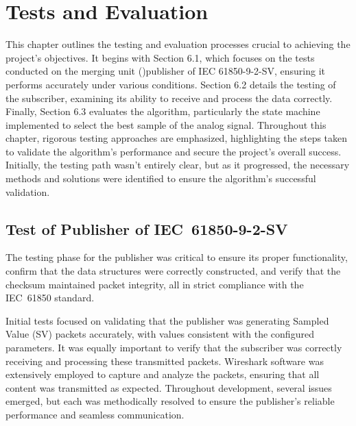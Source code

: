 
\chapter{Tests and Evaluation} %

\label{chap:Chapter6} %


This chapter outlines the testing and evaluation processes crucial to achieving the project’s objectives. It begins with Section 6.1, which focuses on the tests conducted on the merging unit ()publisher of IEC 61850-9-2-SV, ensuring it performs accurately under various conditions. Section 6.2 details the testing of the subscriber, examining its ability to receive and process the data correctly. Finally, Section 6.3 evaluates the algorithm, particularly the state machine implemented to select the best sample of the analog signal. Throughout this chapter, rigorous testing approaches are emphasized, highlighting the steps taken to validate the algorithm's performance and secure the project's overall success. Initially, the testing path wasn’t entirely clear, but as it progressed, the necessary methods and solutions were identified to ensure the algorithm’s successful validation.

\section{Test of Publisher of IEC~61850-9-2-SV}

The testing phase for the publisher was critical to ensure its proper functionality, confirm that the data structures were correctly constructed, and verify that the checksum maintained packet integrity, all in strict compliance with the IEC~61850 standard.

Initial tests focused on validating that the publisher was generating Sampled Value (SV) packets accurately, with values consistent with the configured parameters. It was equally important to verify that the subscriber was correctly receiving and processing these transmitted packets. Wireshark software was extensively employed to capture and analyze the packets, ensuring that all content was transmitted as expected. Throughout development, several issues emerged, but each was methodically resolved to ensure the publisher's reliable performance and seamless communication.

